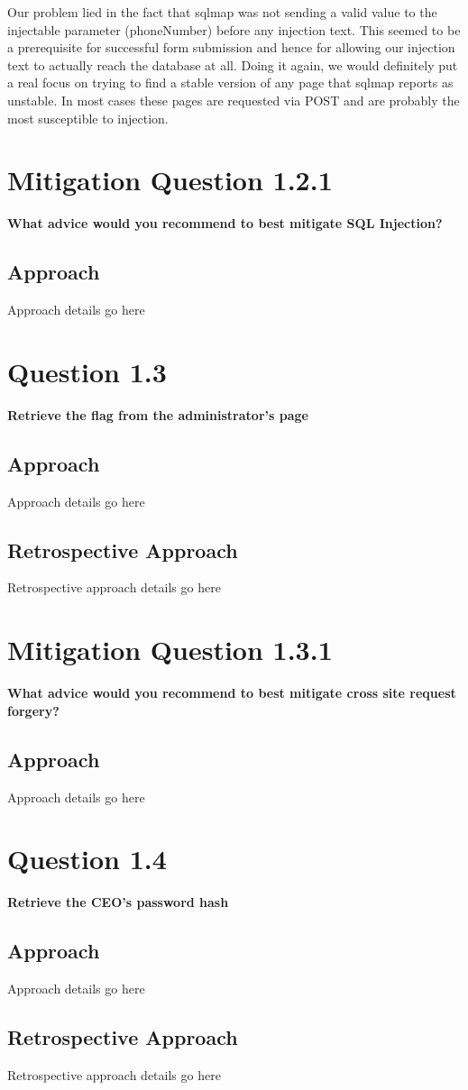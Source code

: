 Our problem lied in the fact that sqlmap was not sending a
valid value to the injectable parameter (phoneNumber) before any injection text.
This seemed to be a prerequisite for successful form submission and hence for
allowing our injection text to actually reach the database at all. Doing it
again, we would definitely put a real focus on trying to find a stable version
of any page that sqlmap reports as unstable. In most cases these pages are
requested via POST and are probably the most susceptible to injection.

\section{Mitigation Question 1.2.1}
\textbf{What advice would you recommend to best mitigate SQL Injection?}
\subsection{Approach}
Approach details go here

\section{Question 1.3}
\textbf{Retrieve the flag from the administrator's page}
\subsection{Approach}
Approach details go here
\subsection{Retrospective Approach}
Retrospective approach details go here

\section{Mitigation Question 1.3.1}
\textbf{What advice would you recommend to best mitigate cross site request
forgery?}
\subsection{Approach}
Approach details go here

\section{Question 1.4}
\textbf{Retrieve the CEO's password hash}
\subsection{Approach}
Approach details go here
\subsection{Retrospective Approach}
Retrospective approach details go here
